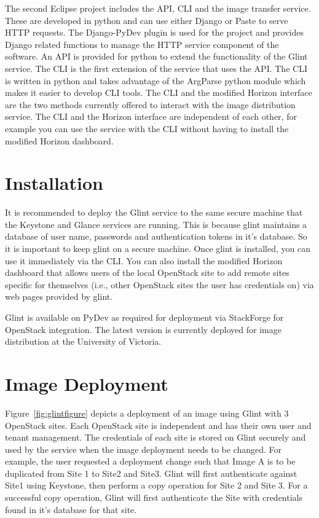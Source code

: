 \documentclass[a4paper]{jpconf}
\begin{document}
The second Eclipse project includes the API, CLI and the image transfer service. These are developed in python and can use either Django or Paste to serve HTTP requests. The Django-PyDev plugin is used for the project and provides Django related functions to manage the HTTP service component of the software. An API is provided for python to extend the functionality of the Glint service. The CLI is the first extension of the service that uses the API. The CLI is written in python and takes advantage of the ArgParse python module which makes it easier to develop CLI tools. The CLI and the modified Horizon interface are the two methods currently offered to interact with the image distribution service. The CLI and the Horizon interface are independent of each other, for example you can use the service with the CLI without having to install the modified Horizon dashboard.


\section{Installation}
It is recommended to deploy the Glint service to the same secure machine that the Keystone and Glance services are running. This is because glint maintains a database of user name, passwords and authentication tokens in it's database. So it is important to keep glint on a secure machine. Once glint is installed, you can use it immediately via the CLI. You can also install the modified Horizon dashboard that allows users of the local OpenStack site to add remote sites specific for themselves (i.e., other OpenStack sites the user has credentials on) via web pages provided by glint.  

Glint is available on PyDev as required for deployment via StackForge for OpenStack integration. The latest version is currently deployed for image distribution at the University of Victoria. 

\section{Image Deployment}
Figure~\ref{fig:glintfigure} depicts a deployment of an image using Glint with 3 OpenStack sites. Each OpenStack site is independent and has their own user and tenant management. The credentials of each site is stored on Glint securely and used by the service when the image deployment needs to be changed. For example, the user requested a deployment change such that Image A is to be duplicated from Site 1 to Site2 and Site3. Glint will first authenticate against Site1 using Keystone, then perform a copy operation for Site 2 and Site 3. For a successful copy operation, Glint will first authenticate the Site with credentials found in it's database for that site.
\end{document}
